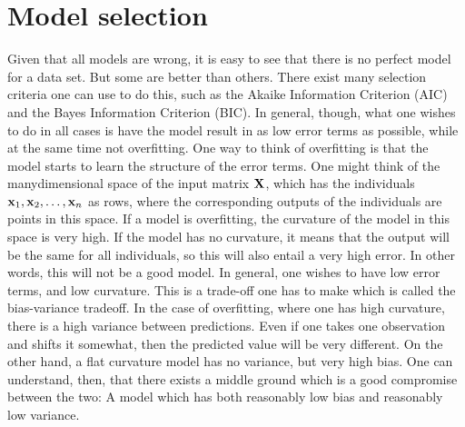 \section{Model selection}
Given that all models are wrong, it is easy to see that there is no perfect model for a data set. But some are better than others. There exist many selection criteria one can use to do this, such as the Akaike Information Criterion (AIC) and the Bayes Information Criterion (BIC). In general, though, what one wishes to do in all cases is have the model result in as low error terms as possible, while at the same time not overfitting. One way to think of overfitting is that the model starts to learn the structure of the error terms. One might think of the manydimensional space of the input matrix $\mathbf{X}$, which has the individuals $\mathbf{x}_{1},\mathbf{x}_{2},\ldots,\mathbf{x}_{n}$ as rows, where the corresponding outputs of the individuals are points in this space. If a model is overfitting, the curvature of the model in this space is very high. If the model has no curvature, it means that the output will be the same for all individuals, so this will also entail a very high error. In other words, this will not be a good model. In general, one wishes to have low error terms, and low curvature. This is a trade-off one has to make which is called the bias-variance tradeoff. In the case of overfitting, where one has high curvature, there is a high variance between predictions. Even if one takes one observation and shifts it somewhat, then the predicted value will be very different. On the other hand, a flat curvature model has no variance, but very high bias. One can understand, then, that there exists a middle ground which is a good compromise between the two: A model which has both reasonably low bias and reasonably low variance.

